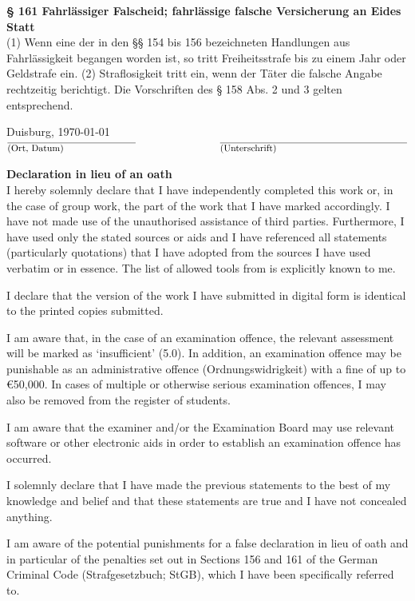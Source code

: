 {\begin{tcolorbox}[colframe=black!100!white,colback=black!0!white,sharp corners]
\tcblower

\footnotesize
\textbf{§ 161 Fahrlässiger Falscheid; fahrlässige falsche Versicherung an Eides Statt}\\
(1) Wenn eine der in den §§ 154 bis 156 bezeichneten Handlungen aus Fahrlässigkeit begangen worden ist,
so tritt Freiheitsstrafe bis zu einem Jahr oder Geldstrafe ein.
(2) Straflosigkeit tritt ein,
wenn der Täter die falsche Angabe rechtzeitig berichtigt.
Die Vorschriften des § 158 Abs. 2 und 3 gelten entsprechend.
\end{tcolorbox}

\vfill
Duisburg, \today\\
$\overline{\parbox{4.8cm}{(Ort, Datum)}} ~~~~~~~~~~~~~~~~~~~~~~~~~~~ \overline{\parbox{7cm}{(Unterschrift)}}$
}
{
\textbf{Declaration in lieu of an oath}\\

I hereby solemnly declare that I have independently completed this work or,
in the case of group work,
the part of the work that I have marked accordingly.
I have not made use of the unauthorised assistance of third parties.
Furthermore, I have used only the stated sources or aids
and I have referenced all statements (particularly quotations)
that I have adopted from the sources I have used verbatim or in essence.
The list of allowed tools from \DTMDate{\dateToolsAndAI} is explicitly known to me.

I declare that the version of the work I have submitted in digital form
is identical to the printed copies submitted.

I am aware that, in the case of an examination offence,
the relevant assessment will be marked as ‘insufficient’ (5.0).
In addition, an examination offence
may be punishable as an administrative offence (Ordnungswidrigkeit)
with a fine of up to €50,000.
In cases of multiple or otherwise serious examination offences,
I may also be removed from the register of students.

I am aware that the examiner and/or the Examination Board
may use relevant software or other electronic aids
in order to establish an examination offence has occurred.

I solemnly declare that I have made the previous statements to the best of my knowledge and
belief and that these statements are true and I have not concealed anything.

I am aware of the potential punishments for a false declaration in lieu of oath
and in particular of the penalties
set out in Sections 156 and 161 of the German Criminal Code (Strafgesetzbuch; StGB),
which I have been specifically referred to.

}
